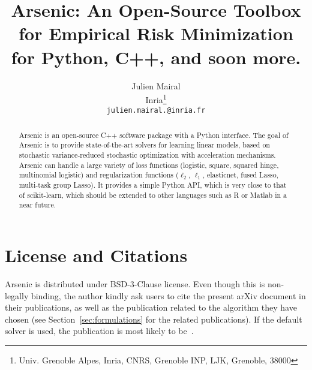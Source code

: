 \documentclass{article}
\title{Arsenic: An Open-Source Toolbox for Empirical Risk Minimization \\ 
for Python, C++, and soon more.
}
\author{
Julien Mairal \\
   Inria\thanks{Univ. Grenoble Alpes, Inria, CNRS, Grenoble INP, LJK, Grenoble, 38000}\\
         \texttt{julien.mairal.@inria.fr}}
\begin{document}
\maketitle

\begin{abstract}
   Arsenic is an open-source C++ software package with a Python interface. 
   The goal of Arsenic is to provide state-of-the-art solvers for learning linear models,
   based on stochastic variance-reduced stochastic optimization with
   acceleration mechanisms.
   Arsenic can handle a large variety of loss functions (logistic, square,
   squared hinge, multinomial logistic) and regularization functions ($\ell_2$,
   $\ell_1$, elasticnet, fused Lasso, multi-task group Lasso).
   It provides a simple Python API, which is very close to that of scikit-learn,
   which should be extended to other languages such as R or Matlab in a near future.
\end{abstract}

\section{License and Citations}
Arsenic is distributed under BSD-3-Clause license. Even though this is non-legally binding, the author kindly ask users to cite the present arXiv document in their publications, as well as the publication related to the algorithm they have chosen (see Section~\ref{sec:formulations} for the related publications). If the default solver is used, the publication is most likely to be~\citep{lin2019inexact}.
\end{document}
